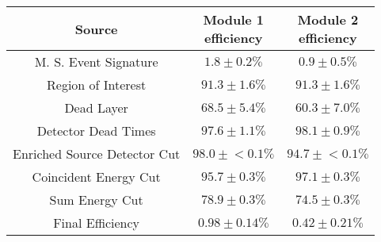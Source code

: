 \begin{tabular}{|c|c|c|}
\hline
  Source & \makecell{Module 1\\efficiency} & \makecell{Module 2\\efficiency} \\
\hline
  M. S. Event Signature & $1.8 \pm 0.2\%$ & $0.9 \pm 0.5\%$ \\
  Region of Interest & $91.3 \pm 1.6\%$ & $91.3 \pm 1.6\%$ \\
  Dead Layer & $68.5 \pm 5.4\%$ & $60.3 \pm 7.0\%$ \\
  Detector Dead Times & $97.6 \pm 1.1\%$ & $98.1 \pm 0.9\%$ \\
  Enriched Source Detector Cut & $98.0 \pm{}<\!0.1\%$ & $94.7 \pm{}<\!0.1\%$ \\
  Coincident Energy Cut & $95.7 \pm 0.3\%$ & $97.1 \pm 0.3\%$ \\
  Sum Energy Cut & $78.9 \pm 0.3\%$ & $74.5 \pm 0.3\%$ \\
  \hline Final Efficiency & $0.98 \pm 0.14\%$ & $0.42 \pm 0.21\%$ \\
\hline
\end{tabular}
